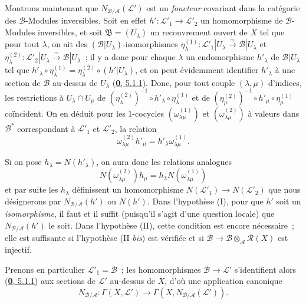 \begin{env}[6.5.3]
\label{II.6.5.3-fr}
Montrons maintenant que $N_{\mathcal{B}/\mathcal{A}}(\mathcal{L}')$ est un
\emph{foncteur} covariant dans la catégorie des $\mathcal{B}$-Modules
inversibles. Soit en effet $h':\mathcal{L}'_1\to\mathcal{L}'_2$ un
homomorphisme de $\mathcal{B}$-Modules inversibles, et soit
$\mathfrak{B}=(U_\lambda)$ un recouvrement ouvert de $X$ tel que pour tout
$\lambda$, on ait des $(\mathcal{B}|U_\lambda)$-isomorphismes
$\eta^{(1)}_\lambda:\mathcal{L}'_1|U_\lambda\xrightarrow{\sim}\mathcal{B}|U_\lambda$ et
$\eta^{(2)}_\lambda:\mathcal{L}'_2|U_\lambda\xrightarrow{\sim}\mathcal{B}|U_\lambda$~;
il y a donc pour chaque $\lambda$ un endomorphisme $h'_\lambda$ de
$\mathcal{B}|U_\lambda$ tel que
$h'_\lambda\circ\eta^{(1)}_\lambda
=\eta^{(2)}_\lambda\circ(h'|U_\lambda)$, et on peut évidemment identifier
$h'_\lambda$ à une section de $\mathcal{B}$ au-dessus de $U_\lambda$
(\hyperref[0.5.1.1-fr]{\textbf{0}, 5.1.1}). Donc, pour tout couple $(\lambda,\mu)$
d'indices, les restrictions à $U_\lambda\cap U_\mu$ de
$(\eta^{(2)}_\lambda)^{-1}\circ h'_\lambda\circ\eta^{(1)}_\lambda$ et de
$(\eta^{(2)}_\mu)^{-1}\circ h'_\mu\circ\eta^{(1)}_\mu$ coïncident. On en
déduit pour les $1$-cocycles $(\omega^{(1)}_{\lambda\mu})$ et
$(\omega^{(2)}_{\lambda\mu})$ à valeurs dans $\mathcal{B}^*$ correspondant à
$\mathcal{L}'_1$ et $\mathcal{L}'_2$, la relation
\[
\omega^{(2)}_{\lambda\mu}h'_\mu
=h'_\lambda\omega^{(1)}_{\lambda\mu}.
\]


Si on pose $h_\lambda=N(h'_\lambda)$, on aura donc les relations analogues
\[
N(\omega^{(2)}_{\lambda\mu})h_\mu
=h_\lambda N(\omega^{(1)}_{\lambda\mu})
\]
et par suite les $h_\lambda$ définissent un homomorphisme
$N(\mathcal{L}'_1)\to N(\mathcal{L}'_2)$ que nous désignerons par
$N_{\mathcal{B}/\mathcal{A}}(h')$ ou $N(h')$. Dans l'hypothèse (I), pour que
$h'$ soit un \emph{isomorphisme}, il faut et il suffit (puisqu'il s'agit d'une
question locale) que $N_{\mathcal{B}/\mathcal{A}}(h')$ le soit. Dans
l'hypothèse (II), cette condition est encore nécessaire~; elle est suffisante
si l'hypothèse (II \emph{bis}) est vérifiée et si
$\mathcal{B}\to\mathcal{B}\otimes_{\mathcal{A}}\mathcal{R}(X)$ est injectif.

Prenons en particulier $\mathcal{L}'_1=\mathcal{B}$~; les homomorphismes
$\mathcal{B}\to\mathcal{L}'$ s'identifient alors
(\hyperref[0.5.1.1-fr]{\textbf{0}, 5.1.1}) aux sections de $\mathcal{L}'$ au-dessus de
$X$, d'où une application canonique
\[
N_{\mathcal{B}/\mathcal{A}}:\Gamma(X,\mathcal{L}')
\to\Gamma(X,N_{\mathcal{B}/\mathcal{A}}(\mathcal{L}')).
\]


\end{env}
